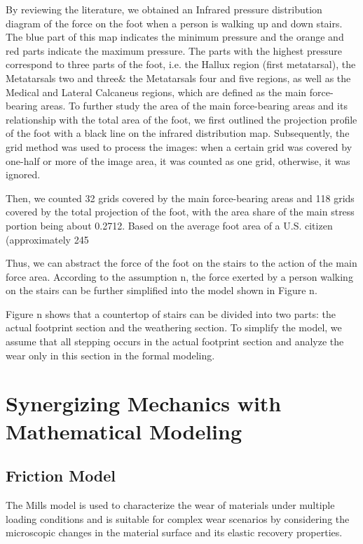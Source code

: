 \documentclass{mcmthesis}
\begin{document}
By reviewing the literature, we obtained an Infrared pressure distribution diagram of the force on the foot when a person is walking up and down stairs\cite{YISX202303023}. The blue part of this map indicates the minimum pressure and the orange and red parts indicate the maximum pressure. The parts with the highest pressure correspond to three parts of the foot, i.e. the Hallux region (first metatarsal), the Metatarsals two and three\& the Metatarsals four and five regions, as well as the Medical and Lateral Calcaneus regions, which are defined as the main force-bearing areas. To further study the area of the main force-bearing areas and its relationship with the total area of the foot, we first outlined the projection profile of the foot with a black line on the infrared distribution map. Subsequently, the grid method was used to process the images: when a certain grid was covered by one-half or more of the image area, it was counted as one grid, otherwise, it was ignored.  

Then, we counted 32 grids covered by the main force-bearing areas and 118 grids covered by the total projection of the foot, with the area share of the main stress portion being about 0.2712. Based on the average foot area of a U.S. citizen (approximately 245 %

Thus, we can abstract the force of the foot on the stairs to the action of the main force area. According to the assumption n, the force exerted by a person walking on the stairs can be further simplified into the model shown in Figure n.

Figure n shows that a countertop of stairs can be divided into two parts: the actual footprint section and the weathering section. To simplify the model, we assume that all stepping occurs in the actual footprint section and analyze the wear only in this section in the formal modeling.
\section{Synergizing Mechanics with Mathematical Modeling}
\subsection{Friction Model}
The Mills model is used to characterize the wear of materials under multiple loading conditions and is suitable for complex wear scenarios by considering the microscopic changes in the material surface and its elastic recovery properties.
\end{document}
